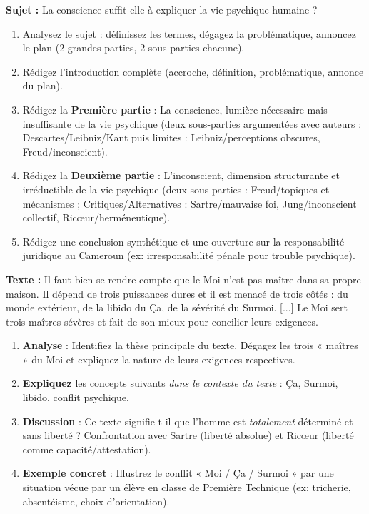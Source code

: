 \documentclass[11pt]{article}
\newcommand{\cle}[1]{{\popxbold\color{popdark}#1}}
\begin{document}
\begin{exercice}
\textbf{Sujet :} \og La conscience suffit-elle à expliquer la vie psychique humaine ? \fg
\begin{enumerate}
    \item Analysez le sujet : définissez les termes, dégagez la problématique, annoncez le plan (2 grandes parties, 2 sous-parties chacune).
    \item Rédigez l'introduction complète (accroche, définition, problématique, annonce du plan).
    \item Rédigez la \textbf{Première partie} : \og La conscience, lumière nécessaire mais insuffisante de la vie psychique \fg (deux sous-parties argumentées avec auteurs : Descartes/Leibniz/Kant puis limites : Leibniz/perceptions obscures, Freud/inconscient).
    \item Rédigez la \textbf{Deuxième partie} : \og L'inconscient, dimension structurante et irréductible de la vie psychique \fg (deux sous-parties : Freud/topiques et mécanismes ; Critiques/Alternatives : Sartre/mauvaise foi, Jung/inconscient collectif, Ricœur/herméneutique).
    \item Rédigez une conclusion synthétique et une ouverture sur la responsabilité juridique au Cameroun (ex: irresponsabilité pénale pour trouble psychique).
\end{enumerate}
\end{exercice}

\begin{exercice}
\textbf{Texte :} \og Il faut bien se rendre compte que le Moi n'est pas maître dans sa propre maison. Il dépend de trois puissances dures et il est menacé de trois côtés : du monde extérieur, de la libido du Ça, de la sévérité du Surmoi. [...] Le Moi sert trois maîtres sévères et fait de son mieux pour concilier leurs exigences. \fg
\begin{enumerate}
    \item \textbf{Analyse} : Identifiez la thèse principale du texte. Dégagez les trois « maîtres » du Moi et expliquez la nature de leurs exigences respectives.
    \item \textbf{Expliquez} les concepts suivants \emph{dans le contexte du texte} : \cle{Ça}, \cle{Surmoi}, \cle{libido}, \cle{conflit psychique}.
    \item \textbf{Discussion} : Ce texte signifie-t-il que l'homme est \emph{totalement} déterminé et sans liberté ? Confrontation avec Sartre (liberté absolue) et Ricœur (liberté comme capacité/attestation).
    \item \textbf{Exemple concret} : Illustrez le conflit « Moi / Ça / Surmoi » par une situation vécue par un élève en classe de Première Technique (ex: tricherie, absentéisme, choix d'orientation).
\end{enumerate}
\end{exercice}
\end{document}
